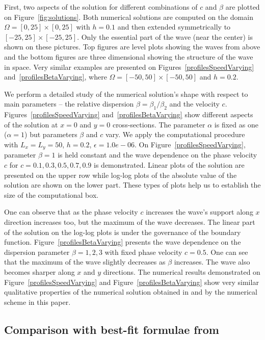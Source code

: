 \documentclass[preprint]{elsarticle}
\begin{document}
First, two aspects of the solution for different combinations of  $c$ and $\beta$   are plotted  on Figure~\ref{fig:solutions}. Both numerical solutions are computed on the  domain $\Omega = [0, 25]\times [0, 25]$ with $h = 0.1$ and then extended symmetrically to $ [-25, 25]\times [-25, 25]$. 
Only the essential part of the wave (near the center) is shown on these pictures. Top figures are level plots showing the waves from above and the bottom figures are 
three dimensional showing the structure of the wave in space. Very similar examples are presented on Figures~\ref{profilesSpeedVarying} and~\ref{profilesBetaVarying}, where $\Omega = [-50, 50]\times [-50, 50] $ and $h = 0.2$.


We perform a detailed study   of the numerical solution's shape with respect to main parameters -- the relative dispersion $\beta=\beta_1 / \beta_2$ and the velocity $c$.
 Figures~\ref{profilesSpeedVarying} and~\ref{profilesBetaVarying} show different aspects of the solution at $x=0$ and $y=0$ cross-sections. The parameter $\alpha$  is fixed as one ($\alpha = 1$) but  parameters $\beta $ and $c$ vary. We apply  the computational procedure with  $L_x = L_y = 50$, $h = 0.2$, $\epsilon = 1.0e-06$. 
On Figure~\ref{profilesSpeedVarying}, parameter $\beta=1$ is held constant and the wave dependence on the phase velocity  $c$ for $c=0.1, 0.3, 0.5, 0.7, 0.9$ is demonstrated.  Linear plots of the solution are presented on the upper row while  log-log plots of the absolute value of the solution are shown on the lower part.  These types of plots help us to establish the size of the computational box. 

One can observe that as the phase velocity $c$ increases the wave's support  along $x$ direction increases too, but the maximum of the wave decreases. The linear part of the solution on the log-log plots is under the governance of the boundary function.
Figure~\ref{profilesBetaVarying} presents the wave dependence on the dispersion parameter  $\beta=1, 2, 3$ with fixed
  phase velocity $c=0.5$. 
 One can see that the maximum of the wave slightly decreases as $\beta$ increases. The wave also becomes sharper along $x$ and $y$ directions.
The numerical results demonstrated on Figure~\ref{profilesSpeedVarying} and Figure~\ref{profilesBetaVarying} show very similar qualitative properties of the numerical solution obtained in  \cite{Ch2012} and by the numerical scheme in this paper.


\subsection{Comparison with best-fit formulae from \cite{Ch2011}} 
\end{document}
